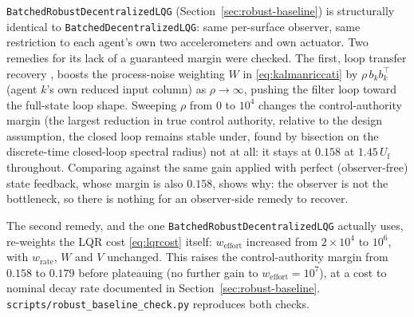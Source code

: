 \documentclass[preprint,11pt,authoryear]{elsarticle}
\newcommand{\Uf}{U_{\mathrm{f}}}
\begin{document}
\texttt{BatchedRobustDecentralizedLQG} (Section~\ref{sec:robust-baseline}) is
structurally identical to \texttt{BatchedDecentralizedLQG}: same per-surface
observer, same restriction to each agent's own two accelerometers and own
actuator. Two remedies for its lack of a guaranteed margin
\citep{doyle1978guaranteed} were checked. The first, loop transfer recovery
\citep{doylestein1981ltr}, boosts the process-noise weighting $W$ in
\eqref{eq:kalmanriccati} by $\rho\, b_k b_k^{\top}$ (agent $k$'s own reduced
input column) as $\rho\to\infty$, pushing the filter loop toward the
full-state loop shape. Sweeping $\rho$ from $0$ to $10^4$ changes the
control-authority margin (the largest reduction in true control authority,
relative to the design assumption, the closed loop remains stable under, found
by bisection on the discrete-time closed-loop spectral radius) not at all: it
stays at $0.158$ at $1.45\,\Uf$ throughout. Comparing against the same gain
applied with perfect (observer-free) state feedback, whose margin is also
$0.158$, shows why: the observer is not the bottleneck, so there is nothing
for an observer-side remedy to recover.

The second remedy, and the one \texttt{BatchedRobustDecentralizedLQG} actually
uses, re-weights the LQR cost \eqref{eq:lqrcost} itself: $w_{\mathrm{effort}}$
increased from $2\times10^4$ to $10^6$, with $w_{\mathrm{rate}}$, $W$ and $V$
unchanged. This raises the control-authority margin from $0.158$ to $0.179$
before plateauing (no further gain to $w_{\mathrm{effort}}=10^{7}$), at a cost
to nominal decay rate documented in Section~\ref{sec:robust-baseline}.
\texttt{scripts/robust\_baseline\_check.py} reproduces both checks.



\end{document}
